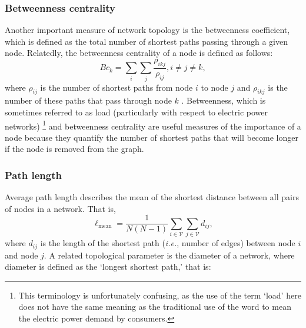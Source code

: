

\subsubsection{Betweenness centrality}

Another important measure of network topology is the betweenness coefficient, which is defined as the total number of shortest paths passing through a given node.  Relatedly, the betweenness centrality of a node is defined as follows:
%
\begin{equation}
Bc_{k}=\sum\limits_{i}\sum\limits_{j}\frac{\rho_{ikj}}{\rho_{ij}},      i \ne j \ne k,
\end{equation}
%
where $\rho_{ij}$ is the number of shortest paths from node $i$ to node $j$ and $\rho_{ikj}$ is the number of these paths that pass through node $k$ \cite{Holme2002}. Betweenness, which is sometimes referred to as load (particularly with respect to electric power networks) \footnote[2]{This terminology is unfortunately confusing, as the use of the term `load' here does not have the same meaning as the traditional use of the word to mean the electric power demand by consumers.} \cite{Albert2004,Crucitti2004a,Crucitti2004b,Kinney2005,Motter2002a,Motter2002b,Pepyne2007,Simonsen2008} and betweenness centrality are useful measures of the importance of a node because they quantify the number of shortest paths that will become longer if the node is removed from the graph.


\subsubsection{Path length}

Average path length describes the mean of the shortest distance between all pairs of nodes in a network. That is,
%
\begin{equation}
\ell_{\text{mean}}=\frac{1}{N(N-1)}\sum\limits_{i \in \mathcal{V}}\sum\limits_{j \in \mathcal{V}} d_{ij},
\end{equation}
%
where $d_{ij}$ is the length of the shortest path (\emph{i.e.}, number of edges) between node $i$ and node $j$. A related topological parameter is the diameter of a network, where diameter is defined as the `longest shortest path,' that is:

